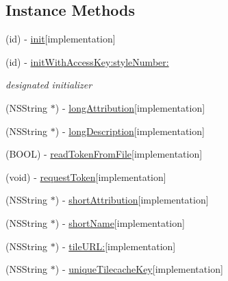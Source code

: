 \subsection*{Instance Methods}
\begin{DoxyCompactItemize}
\item 
(id) -\/ \hyperlink{interface_r_m_cloud_made_map_source_ac1f36511f1261c96378989182fbdc724}{init}{\ttfamily  \mbox{[}implementation\mbox{]}}
\item 
(id) -\/ \hyperlink{interface_r_m_cloud_made_map_source_a604b3cd4b99894be4269193e9f860a83}{init\-With\-Access\-Key\-:style\-Number\-:}
\begin{DoxyCompactList}\small\item\em designated initializer \end{DoxyCompactList}\item 
(N\-S\-String $\ast$) -\/ \hyperlink{interface_r_m_cloud_made_map_source_a591d36a1e1d2d5d5024a568339542b5e}{long\-Attribution}{\ttfamily  \mbox{[}implementation\mbox{]}}
\item 
(N\-S\-String $\ast$) -\/ \hyperlink{interface_r_m_cloud_made_map_source_a0f04c8a09c3d1a9f25dcd4f45af2934b}{long\-Description}{\ttfamily  \mbox{[}implementation\mbox{]}}
\item 
(B\-O\-O\-L) -\/ \hyperlink{interface_r_m_cloud_made_map_source_a049018aa73338e739b40aa1c2aac811d}{read\-Token\-From\-File}{\ttfamily  \mbox{[}implementation\mbox{]}}
\item 
(void) -\/ \hyperlink{interface_r_m_cloud_made_map_source_a8e94aaa198d58bcf380dd9671bd063f8}{request\-Token}{\ttfamily  \mbox{[}implementation\mbox{]}}
\item 
(N\-S\-String $\ast$) -\/ \hyperlink{interface_r_m_cloud_made_map_source_a24b31ad20954e02ffde188c4a008d2e8}{short\-Attribution}{\ttfamily  \mbox{[}implementation\mbox{]}}
\item 
(N\-S\-String $\ast$) -\/ \hyperlink{interface_r_m_cloud_made_map_source_a5e956b126886325f16f34684d974262c}{short\-Name}{\ttfamily  \mbox{[}implementation\mbox{]}}
\item 
(N\-S\-String $\ast$) -\/ \hyperlink{interface_r_m_cloud_made_map_source_a25ff631fb042ace3eae48132f484a88e}{tile\-U\-R\-L\-:}{\ttfamily  \mbox{[}implementation\mbox{]}}
\item 
(N\-S\-String $\ast$) -\/ \hyperlink{interface_r_m_cloud_made_map_source_aae477f125ad88298f778b14b079a7bbb}{unique\-Tilecache\-Key}{\ttfamily  \mbox{[}implementation\mbox{]}}
\end{DoxyCompactItemize}

